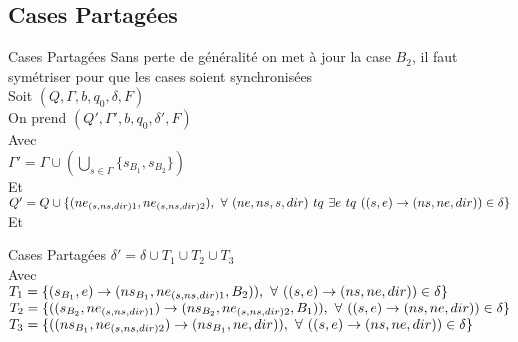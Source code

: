 \documentclass[12pt]{beamer}
\begin{document}
\subsection{Cases Partagées}
\begin{frame}{Cases Partagées}
    Sans perte de généralité on met à jour la case $B_2$, il faut symétriser pour que les cases soient synchronisées\\
    Soit $(Q, \Gamma, b, q_0, \delta, F)$\\
    On prend $(Q', \Gamma', b, q_0, \delta', F)$\\
    Avec\\
    $\Gamma' = \Gamma \cup (\bigcup\limits_{s\in\Gamma} \{s_{B_1}, s_{B_2}\})$\\
    Et\\
    $Q' = Q \cup \{(ne_{(s,ns,dir)1},ne_{(s,ns,dir)2}),\hspace{0.125cm}\forall \hspace{0.125cm} (ne,ns,s,dir) \hspace{0.125cm} tq \hspace{0.125cm} \exists e \hspace{0.125cm} tq  \hspace{0.125cm} ((s,e)\rightarrow(ns,ne,dir)) \in \delta\} $ \\
    Et\\
\end{frame}
\begin{frame}{Cases Partagées}
    $\delta' = \delta \cup T_1 \cup T_2 \cup T_3$\\
    Avec\\
    $T_1 = \{(s_{B_1},e)\rightarrow(ns_{B_1},ne_{(s,ns,dir)1},B_2)),\hspace{0.125cm}
    \forall \hspace{0.125cm} ((s,e)\rightarrow(ns,ne,dir)) \in \delta\}$\\
    $T_2 = \{((s_{B_2},ne_{(s,ns,dir)1})\rightarrow(ns_{B_2},ne_{(s,ns,dir)2},B_1)),\hspace{0.125cm}
    \forall \hspace{0.125cm} ((s,e)\rightarrow(ns,ne,dir)) \in \delta\}$\\
    $T_3 = \{((ns_{B_1},ne_{(s,ns,dir)2})\rightarrow(ns_{B_1},ne,dir)),\hspace{0.125cm}
    \forall \hspace{0.125cm} ((s,e)\rightarrow(ns,ne,dir)) \in \delta\}$\\
\end{frame}
\end{document}
